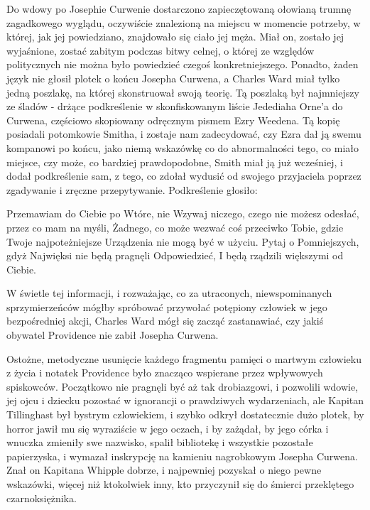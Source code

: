Do wdowy po Josephie Curwenie dostarczono zapieczętowaną ołowianą trumnę zagadkowego wyglądu, oczywiście znalezioną na miejscu w momencie potrzeby, w której, jak jej powiedziano, znajdowało się ciało jej męża. Miał on, zostało jej wyjaśnione, zostać zabitym podczas bitwy celnej, o której ze względów politycznych nie można było powiedzieć czegoś konkretniejszego. Ponadto, żaden język nie głosił plotek o końcu Josepha Curwena, a Charles Ward miał tylko jedną poszlakę, na której skonstruował swoją teorię. Tą poszlaką był najmniejszy ze śladów - drżące podkreślenie w skonfiskowanym liście Jedediaha Orne'a do Curwena, częściowo skopiowany odręcznym pismem Ezry Weedena. Tą kopię posiadali potomkowie Smitha, i zostaje nam zadecydować, czy Ezra dał ją swemu kompanowi po końcu, jako niemą wskazówkę co do abnormalności tego, co miało miejsce, czy może, co bardziej prawdopodobne, Smith miał ją już wcześniej, i dodał podkreślenie sam, z tego, co zdołał wydusić od swojego przyjaciela poprzez zgadywanie i zręczne przepytywanie. Podkreślenie głosiło: 

\begin{displayquote}

Przemawiam do Ciebie po Wtóre, nie Wzywaj niczego, czego nie możesz odesłać, przez co mam na myśli, Żadnego, co może wezwać coś przeciwko Tobie, gdzie Twoje najpoteżniejsze Urządzenia nie mogą być w użyciu. Pytaj o Pomniejszych, gdyż Najwięksi nie będą pragnęli Odpowiedzieć, I będą rządzili większymi od Ciebie.

\end{displayquote}

W świetle tej informacji, i rozważając, co za utraconych, niewspominanych sprzymierzeńców mógłby spróbować przywołać potępiony człowiek  w jego bezpośredniej akcji, Charles Ward mógł się zacząć zastanawiać, czy jakiś obywatel Providence nie zabił Josepha Curwena. 

Ostożne, metodyczne usunięcie każdego fragmentu pamięci o martwym człowieku z życia i notatek Providence było znacząco wspierane przez wpływowych spiskowców. Początkowo nie pragnęli być aż tak drobiazgowi, i pozwolili wdowie, jej ojcu i dziecku pozostać w ignorancji o prawdziwych wydarzeniach, ale Kapitan Tillinghast był bystrym czlowiekiem, i szybko odkrył dostatecznie dużo plotek, by horror jawił mu się wyraziście w jego oczach, i by zażądał, by jego córka i wnuczka zmieniły swe nazwisko, spalił bibliotekę i wszystkie pozostałe papierzyska, i wymazał inskrypcję na kamieniu nagrobkowym Josepha Curwena. Znał on Kapitana Whipple dobrze, i najpewniej pozyskał o niego pewne wskazówki, więcej niż ktokolwiek inny, kto przyczynił się do śmierci przeklętego czarnoksiężnika. 

